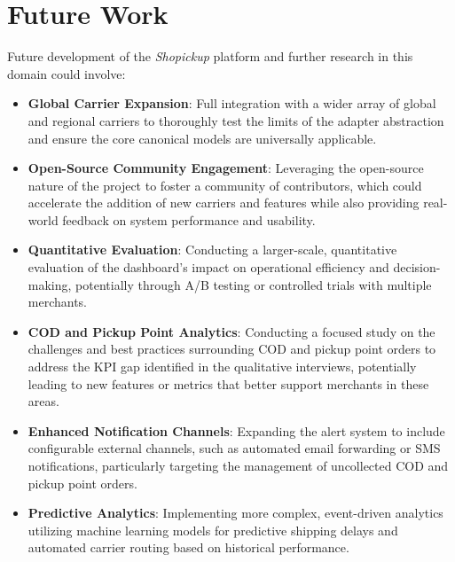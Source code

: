 \documentclass{imc-inf}
\begin{document}
\section{Future Work}
Future development of the \textit{Shopickup} platform and further research in this domain could involve:
\begin{itemize}
  \item \textbf{Global Carrier Expansion}: Full integration with a wider array of global and regional carriers to thoroughly test the limits of the adapter abstraction and ensure the core canonical models are universally applicable.
  \item \textbf{Open-Source Community Engagement}: Leveraging the open-source nature of the project to foster a community of contributors, which could accelerate the addition of new carriers and features while also providing real-world feedback on system performance and usability.
  \item \textbf{Quantitative Evaluation}: Conducting a larger-scale, quantitative evaluation of the dashboard's impact on operational efficiency and decision-making, potentially through A/B testing or controlled trials with multiple merchants.
  \item \textbf{COD and Pickup Point Analytics}: Conducting a focused study on the challenges and best practices surrounding COD and pickup point orders to address the KPI gap identified in the qualitative interviews, potentially leading to new features or metrics that better support merchants in these areas.
  \item \textbf{Enhanced Notification Channels}: Expanding the alert system to include configurable external channels, such as automated email forwarding or SMS notifications, particularly targeting the management of uncollected COD and pickup point orders.
  \item \textbf{Predictive Analytics}: Implementing more complex, event-driven analytics utilizing machine learning models for predictive shipping delays and automated carrier routing based on historical performance.
\end{itemize}


\backmatter
\printbibliography
\end{document}
